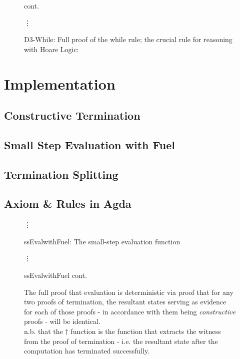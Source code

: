 \documentclass[oneside,12pt]{article}
\begin{document}
\begin{figure}\ContinuedFloat
  \caption{D3-While: Full proof of the while rule; the crucial rule for reasoning with Hoare Logic:}
  \vspace{-0.8cm}
  \begin{center}\!\!\!\small{cont.}\end{center}
  {\centering \hfill \Huge{\vdots} \hfill }
   \centering
   \small
   
\end{figure}


\section{Implementation}

\subsection{Constructive Termination}


\lipsum[66-69]


\subsection{Small Step Evaluation with Fuel}


\lipsum[66-69]


\subsection{Termination Splitting}


\lipsum[66-75]


\subsection{Axiom \& Rules in Agda}


\begin{figure}
  \caption{ssEvalwithFuel: The small-step evaluation function}
  \centering
  
  {\centering \hfill \Huge{\vdots} \hfill }
\end{figure}

\begin{figure}\ContinuedFloat
  \caption{ssEvalwithFuel cont.}
  \centering
  { \hfill \Huge{\vdots} \hfill }
  
\end{figure}

\begin{figure}
  \caption{The full proof that evaluation is deterministic via proof that for any two proofs of termination, the resultant states serving as evidence for each of those proofs - in accordance with them being \emph{constructive} proofs - will be identical.  \\ n.b. that the $\dagger$ function is the function that extracts the witness from the proof of termination - i.e. the resultant state after the computation has terminated successfully.}
  \centering
  \scriptsize
  
\end{figure}
\end{document}
